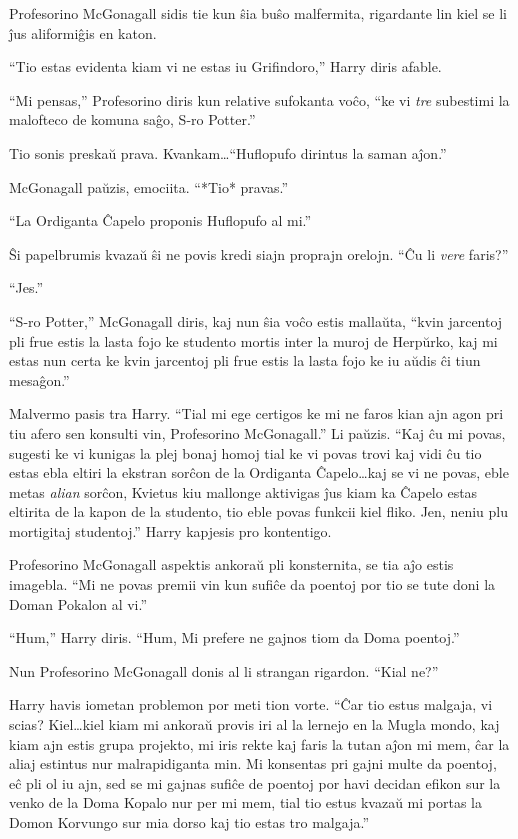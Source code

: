 Profesorino McGonagall sidis tie kun ŝia buŝo malfermita, rigardante
lin kiel se li ĵus aliformiĝis en katon.

``Tio estas evidenta kiam vi ne estas iu Grifindoro,'' Harry diris afable.

``Mi pensas,'' Profesorino diris kun relative sufokanta voĉo, ``ke vi
\emph{tre} subestimi la malofteco de komuna saĝo, S-ro Potter.''

Tio sonis preskaŭ prava. Kvankam\ldots ``Huflopufo dirintus la saman aĵon.''

McGonagall paŭzis, emociita. ``*Tio* pravas.''

``La Ordiganta Ĉapelo proponis Huflopufo al mi.''

Ŝi papelbrumis kvazaŭ ŝi ne povis kredi siajn proprajn orelojn. ``Ĉu
li \emph{vere} faris?''

``Jes.''

``S-ro Potter,'' McGonagall diris, kaj nun ŝia voĉo estis mallaŭta,
``kvin jarcentoj pli frue estis la lasta fojo ke studento mortis inter
la muroj de Herpŭrko, kaj mi estas nun certa ke kvin jarcentoj pli
frue estis la lasta fojo ke iu aŭdis ĉi tiun mesaĝon.''

Malvermo pasis tra Harry. ``Tial mi ege certigos ke mi ne faros kian
ajn agon pri tiu afero sen konsulti vin, Profesorino McGonagall.'' Li
paŭzis. ``Kaj ĉu mi povas, sugesti ke vi kunigas la plej bonaj homoj
tial ke vi povas trovi kaj vidi ĉu tio estas ebla eltiri la ekstran
sorĉon de la Ordiganta Ĉapelo\ldots kaj se vi ne povas, eble metas
\emph{alian} sorĉon, Kvietus kiu mallonge aktivigas ĵus kiam ka Ĉapelo
estas eltirita de la kapon de la studento, tio eble povas funkcii kiel
fliko. Jen, neniu plu mortigitaj studentoj.'' Harry kapjesis pro
kontentigo.

Profesorino McGonagall aspektis ankoraŭ pli konsternita, se tia aĵo
estis imagebla. ``Mi ne povas premii vin kun sufiĉe da poentoj por tio
se tute doni la Doman Pokalon al vi.''

``Hum,'' Harry diris. ``Hum, Mi prefere ne gajnos tiom da Doma
poentoj.''

Nun Profesorino McGonagall donis al li strangan rigardon. ``Kial ne?''

Harry havis iometan problemon por meti tion vorte. ``Ĉar tio estus
malgaja, vi scias? Kiel\ldots kiel kiam mi ankoraŭ provis iri al la
lernejo en la Mugla mondo, kaj kiam ajn estis grupa projekto, mi iris
rekte kaj faris la tutan aĵon mi mem, ĉar la aliaj estintus nur
malrapidiganta min. Mi konsentas pri gajni multe da poentoj, eĉ pli ol
iu ajn, sed se mi gajnas sufiĉe de poentoj por havi decidan efikon sur
la venko de la Doma Kopalo nur per mi mem, tial tio estus kvazaŭ mi
portas la Domon Korvungo sur mia dorso kaj tio estas tro malgaja.''


